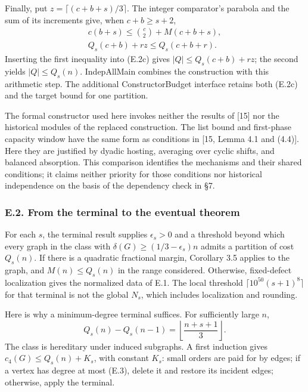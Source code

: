 \documentclass[english,11pt,a4paper]{article}
\begin{document}
Finally, put \(z=\lceil(c+b+s)/3\rceil\). The integer comparator's parabola and the sum of its increments give, when \(c+b\ge s+2\), \[
\begin{gathered}
c(b+s)\le\binom c2+M(c+b+s),\\
Q_s(c+b)+rz\le Q_s(c+b+r).
\end{gathered}
\tag{E.2e}
\] Inserting the first inequality into (E.2c) gives \(|Q|\le Q_s(c+b)+rz\); the second yields \(|Q|\le Q_s(n)\). IndepAllMain combines the construction with this arithmetic step. The additional ConstructorBudget interface retains both (E.2c) and the target bound for one partition.

The formal constructor used here invokes neither the results of {[}15{]} nor the historical modules of the replaced construction. The list bound and first-phase capacity window have the same form as conditions in {[}15, Lemma 4.1 and (4.4){]}. Here they are justified by dyadic hosting, averaging over cyclic shifts, and balanced absorption. This comparison identifies the mechanisms and their shared conditions; it claims neither priority for those conditions nor historical independence on the basis of the dependency check in §7.

\subsubsection{E.2. From the terminal to the eventual theorem}\label{e.2.-from-the-terminal-to-the-eventual-theorem}

For each \(s\), the terminal result supplies \(\epsilon_s>0\) and a threshold beyond which every graph in the class with \(\delta(G)\ge(1/3-\epsilon_s)n\) admits a partition of cost \(Q_s(n)\). If there is a quadratic fractional margin, Corollary 3.5 applies to the graph, and \(M(n)\le Q_s(n)\) in the range considered. Otherwise, fixed-defect localization gives the normalized data of E.1. The local threshold \(\lceil10^{50}(s+1)^8\rceil\) for that terminal is not the global \(N_s\), which includes localization and rounding.

Here is why a minimum-degree terminal suffices. For sufficiently large \(n\), \[
Q_s(n)-Q_s(n-1)=\left\lfloor\frac{n+s+1}{3}\right\rfloor.
\tag{E.3}
\] The class is hereditary under induced subgraphs. A first induction gives \(c_4(G)\le Q_s(n)+K_s\), with constant \(K_s\): small orders are paid for by edges; if a vertex has degree at most (E.3), delete it and restore its incident edges; otherwise, apply the terminal.
\end{document}
